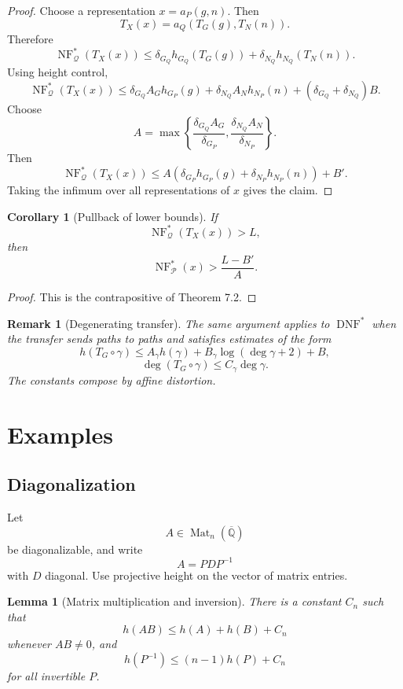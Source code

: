 \documentclass[11pt]{article}
\newtheorem{lemma}[theorem]{Lemma}
\newtheorem{corollary}[theorem]{Corollary}
\newtheorem{remark}[theorem]{Remark}
\DeclareMathOperator{\DNF}{DNF}
\DeclareMathOperator{\Mat}{Mat}
\DeclareMathOperator{\NF}{NF}
\begin{document}
\begin{proof}
Choose a representation \(x=a_P(g,n)\). Then
\[
T_X(x)=a_Q(T_G(g),T_N(n)).
\]
Therefore
\[
\NF_{\mathcal Q}^{\ast}(T_X(x))
\leq
\delta_{G_Q}h_{G_Q}(T_G(g))
+\delta_{N_Q}h_{N_Q}(T_N(n)).
\]
Using height control,
\[
\NF_{\mathcal Q}^{\ast}(T_X(x))
\leq
\delta_{G_Q}A_Gh_{G_P}(g)
+\delta_{N_Q}A_Nh_{N_P}(n)
+(\delta_{G_Q}+\delta_{N_Q})B.
\]
Choose
\[
A=
\max\left\{
\frac{\delta_{G_Q}A_G}{\delta_{G_P}},
\frac{\delta_{N_Q}A_N}{\delta_{N_P}}
\right\}.
\]
Then
\[
\NF_{\mathcal Q}^{\ast}(T_X(x))
\leq
A\left(\delta_{G_P}h_{G_P}(g)+\delta_{N_P}h_{N_P}(n)\right)+B'.
\]
Taking the infimum over all representations of \(x\) gives the claim.
\end{proof}

\begin{corollary}[Pullback of lower bounds]
If
\[
\NF_{\mathcal Q}^{\ast}(T_X(x))>L,
\]
then
\[
\NF_{\mathcal P}^{\ast}(x)>\frac{L-B'}{A}.
\]
\end{corollary}

\begin{proof}
This is the contrapositive of Theorem 7.2.
\end{proof}

\begin{remark}[Degenerating transfer]
The same argument applies to \(\DNF^\ast\) when the transfer sends paths to paths and satisfies estimates of the form
\[
h(T_G\circ\gamma)
\leq
A_\gamma h(\gamma)+B_\gamma\log(\deg\gamma+2)+B,
\]
\[
\deg(T_G\circ\gamma)\leq C_\gamma\deg\gamma.
\]
The constants compose by affine distortion.
\end{remark}

\section{Examples}

\subsection{Diagonalization}

Let
\[
A\in\Mat_n(\overline{\mathbb Q})
\]
be diagonalizable, and write
\[
A=PDP^{-1}
\]
with \(D\) diagonal. Use projective height on the vector of matrix entries.

\begin{lemma}[Matrix multiplication and inversion]
There is a constant \(C_n\) such that
\[
h(AB)\leq h(A)+h(B)+C_n
\]
whenever \(AB\neq 0\), and
\[
h(P^{-1})\leq (n-1)h(P)+C_n
\]
for all invertible \(P\).
\end{lemma}
\end{document}
